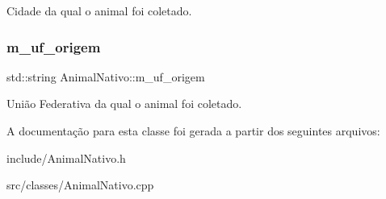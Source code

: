 Cidade da qual o animal foi coletado. \mbox{\label{classAnimalNativo_a5ee01fe0f43cac32ad2b729e99e036b3}} 
\subsubsection{\texorpdfstring{m\+\_\+uf\+\_\+origem}{m\_uf\_origem}}
{\footnotesize\ttfamily std\+::string Animal\+Nativo\+::m\+\_\+uf\+\_\+origem\hspace{0.3cm}{\ttfamily [protected]}}

União Federativa da qual o animal foi coletado. 

A documentação para esta classe foi gerada a partir dos seguintes arquivos\+:\begin{DoxyCompactItemize}
\item 
include/Animal\+Nativo.\+h\item 
src/classes/Animal\+Nativo.\+cpp\end{DoxyCompactItemize}
